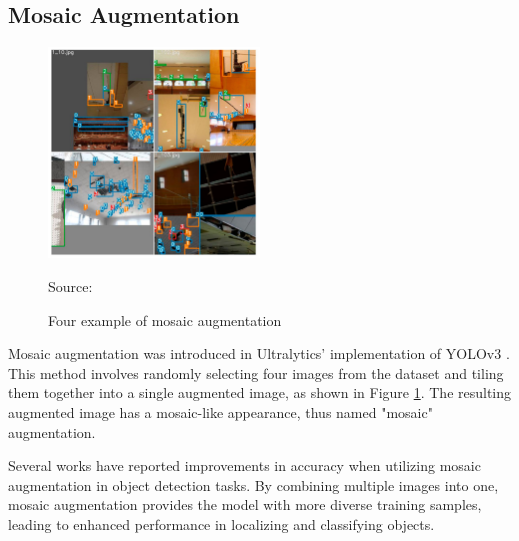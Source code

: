   \subsection{Mosaic Augmentation}
  \label{section:mosaic_study}
  \begin{figure}[H]
    \centering
    \includegraphics[width=0.5\textwidth]{figures/mosaic-aug.png}
    \caption*{Source: \textcite{mosaic}}
    \caption{Four example of mosaic augmentation}
    \label{fig:mosaic}
  \end{figure}
  Mosaic augmentation was introduced in Ultralytics' implementation of YOLOv3 \parencite{mosaic_aug}. 
  This method involves randomly selecting four images from the dataset and tiling them together into a single augmented image, as shown in Figure \ref{fig:mosaic}. 
  The resulting augmented image has a mosaic-like appearance, thus named "mosaic" augmentation.

  Several works \parencites{cspnet}{yolov4}{yolov5} have reported improvements in accuracy when utilizing mosaic augmentation in object detection tasks.
  By combining multiple images into one, mosaic augmentation provides the model with more diverse training samples, leading to enhanced performance in localizing and classifying objects.


